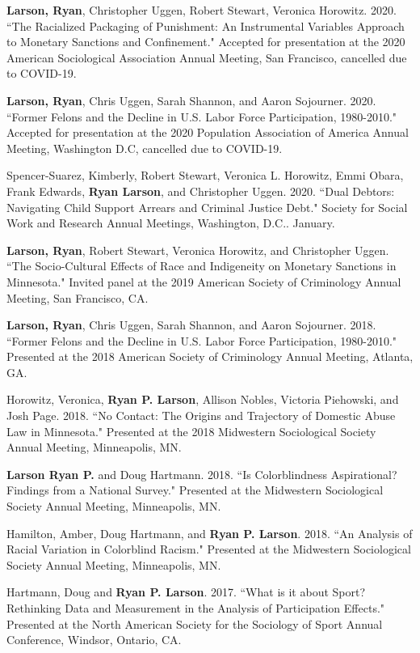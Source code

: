 \documentclass[letterpaper]{article}
\renewenvironment{itemize}{
  \begin{list}{}{
    \setlength{\leftmargin}{1.5em}
  }
}{
  \end{list}
}
\begin{document}
\begin{itemize}
\item \textbf{Larson, Ryan}, Christopher Uggen, Robert Stewart, Veronica Horowitz. 2020. ``The Racialized Packaging of Punishment: An Instrumental Variables Approach to Monetary Sanctions and Confinement." Accepted for presentation at the 2020 American Sociological Association Annual Meeting, San Francisco, cancelled due to COVID-19. 
\item \textbf{Larson, Ryan}, Chris Uggen, Sarah Shannon, and Aaron Sojourner. 2020. ``Former Felons and the Decline in U.S. Labor Force Participation, 1980-2010." Accepted for presentation at the 2020 Population Association of America Annual Meeting, Washington D.C, cancelled due to COVID-19. 
\item Spencer-Suarez, Kimberly, Robert Stewart, Veronica L. Horowitz, Emmi Obara, Frank Edwards, \textbf{Ryan Larson}, and Christopher Uggen. 2020. ``Dual Debtors: Navigating Child Support Arrears and Criminal Justice Debt." Society for Social Work and Research Annual Meetings, Washington, D.C.. January.
\item \textbf{Larson, Ryan}, Robert Stewart, Veronica Horowitz, and Christopher Uggen. ``The Socio-Cultural Effects of Race and Indigeneity on Monetary Sanctions in Minnesota." Invited panel at the 2019 American Society of Criminology Annual Meeting, San Francisco, CA.
\item \textbf{Larson, Ryan}, Chris Uggen, Sarah Shannon, and Aaron Sojourner. 2018. ``Former Felons and the Decline in U.S. Labor Force Participation, 1980-2010." Presented at the 2018 American Society of Criminology Annual Meeting, Atlanta, GA. 
\item Horowitz, Veronica, \textbf{Ryan P. Larson}, Allison Nobles, Victoria Piehowski, and Josh Page.  2018. ``No Contact: The Origins and Trajectory of Domestic Abuse Law in Minnesota." Presented at the 2018 Midwestern Sociological Society Annual Meeting, Minneapolis, MN. 
\item \textbf{Larson Ryan P.} and Doug Hartmann. 2018. ``Is Colorblindness Aspirational? Findings from a National Survey." Presented at the Midwestern Sociological Society Annual Meeting, Minneapolis, MN. 
\item Hamilton, Amber, Doug Hartmann, and \textbf{Ryan P. Larson}. 2018. ``An Analysis of Racial Variation in Colorblind Racism." Presented at the Midwestern Sociological Society Annual Meeting, Minneapolis, MN. 
\item Hartmann, Doug and \textbf{Ryan P. Larson}. 2017. ``What is it about Sport? Rethinking Data and Measurement in the Analysis of Participation Effects."  Presented at the North American Society for the Sociology of Sport Annual Conference, Windsor, Ontario, CA. 

\end{itemize}
\end{document}

